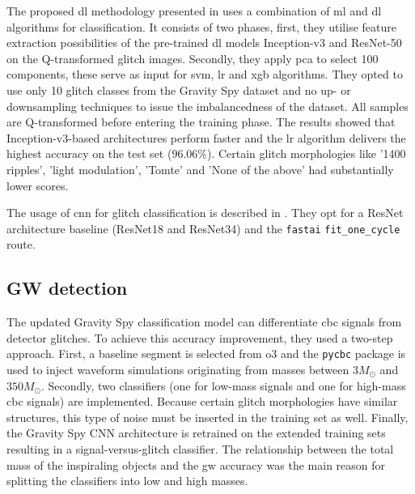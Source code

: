 The proposed \acrshort{dl} methodology presented in \citep{bicskin2023fast} uses a combination of \acrshort{ml} and \acrshort{dl} algorithms for classification. It consists of two phases, first, they utilise feature extraction possibilities of the pre-trained \acrshort{dl} models Inception-v3 \citep{szegedy2016rethinking} and ResNet-50 \citep{he2016deep} on the Q-transformed glitch images. Secondly, they apply \acrshort{pca} to select 100 components, these serve as input for \acrshort{svm}, \acrshort{lr} and \acrshort{xgb} algorithms. They opted to use only 10 glitch classes from the Gravity Spy dataset and no up- or downsampling techniques to issue the imbalancedness of the dataset. All samples are Q-transformed before entering the training phase. The results showed that Inception-v3-based architectures perform faster and the \acrshort{lr} algorithm delivers the highest accuracy on the test set ($96.06$\%). Certain glitch morphologies like '1400 ripples', 'light modulation', 'Tomte' and 'None of the above' had substantially lower scores.

The usage of \acrshort{cnn} for glitch classification is described in \citep{fernandes2023convolutional}. They opt for a ResNet \citep{he2016deep} architecture baseline (ResNet18 and ResNet34) and the \verb|fastai| \verb|fit_one_cycle| route. 

\subsection{GW detection}
The updated Gravity Spy classification model \citep{jarov2023new} can differentiate \acrshort{cbc} signals from detector glitches. To achieve this accuracy improvement, they used a two-step approach. First, a baseline segment is selected from \acrshort{o3} and the \verb|pycbc| package \citep{nitz2020gwastro} is used to inject waveform simulations originating from masses between $3M_{\odot}$ and $350M_{\odot}$. Secondly, two classifiers (one for low-mass signals and one for high-mass \acrshort{cbc} signals) are implemented. Because certain glitch morphologies have similar structures, this type of noise must be inserted in the training set as well. Finally, the Gravity Spy CNN architecture is retrained on the extended training sets resulting in a signal-versus-glitch classifier. The relationship between the total mass of the inspiraling objects and the \acrshort{gw} accuracy was the main reason for splitting the classifiers into low and high masses. 
